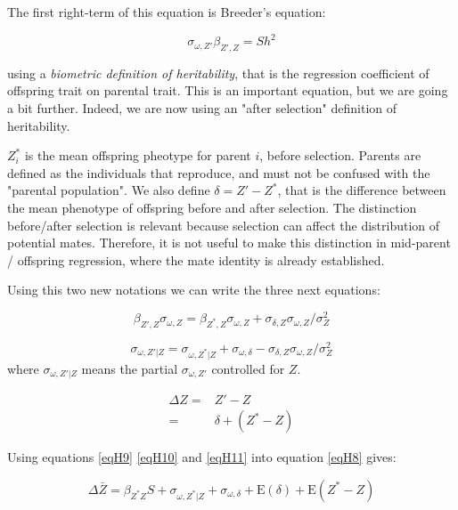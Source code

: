 The first right-term of this equation is Breeder's equation: 

\begin{equation}
\sigma_{\omega,Z'}\beta_{Z',Z}=S h^2
\end{equation}

using a \textit{biometric definition of heritability}, that is the regression coefficient of offspring trait on parental trait. This is an important equation, but we are going a bit further.
Indeed, we are now using an "after selection" definition of heritability. 



$Z^{\ast}_i$ is the mean offspring pheotype for parent $i$, before selection.
Parents are defined as the individuals that reproduce, and must not be confused with the "parental population".
We also define $\delta=Z'-Z^{\ast}$, that is the difference between the mean phenotype of offspring before and after selection.
The distinction before/after selection is relevant because selection can affect the distribution of potential mates. Therefore, it is not useful to make this distinction in mid-parent / offspring regression, where the mate identity is already established.

Using this two new notations we can write the three next equations:

\begin{equation}
\beta_{Z',Z}\sigma_{\omega,Z}=\beta_{Z^{\ast} ,Z}\sigma_{\omega,Z}+\sigma_{\delta,Z}\sigma_{\omega, Z}/\sigma_{Z}^2
\label{eqH9}
\end{equation}

\begin{equation}
\sigma_{\omega,Z' | Z}=\sigma_{\omega,Z^{\ast} | Z}+\sigma_{\omega,\delta}-\sigma_{\delta,Z}\sigma_{\omega,Z}/\sigma_{Z}^2
\label{eqH10}
\end{equation}
where $\sigma_{\omega,Z' | Z}$ means the partial $\sigma_{\omega,Z'}$ controlled for $Z$.

\begin{align}
\Delta Z =& Z' - Z\\
		=& \delta + (Z^{\ast}-Z)
\label{eqH11}
\end{align}

Using equations \ref{eqH9} \ref{eqH10} and \ref{eqH11} into equation \ref{eqH8} gives:


\begin{equation}
\Delta \bar{Z}=\beta_{Z^{\ast}Z}S+\sigma_{\omega,Z^{\ast} | Z}+\sigma_{\omega,\delta}+\mathrm{E}(\delta) + \mathrm{E}(Z^{\ast}-Z)
\label{eqH12}
\end{equation}

